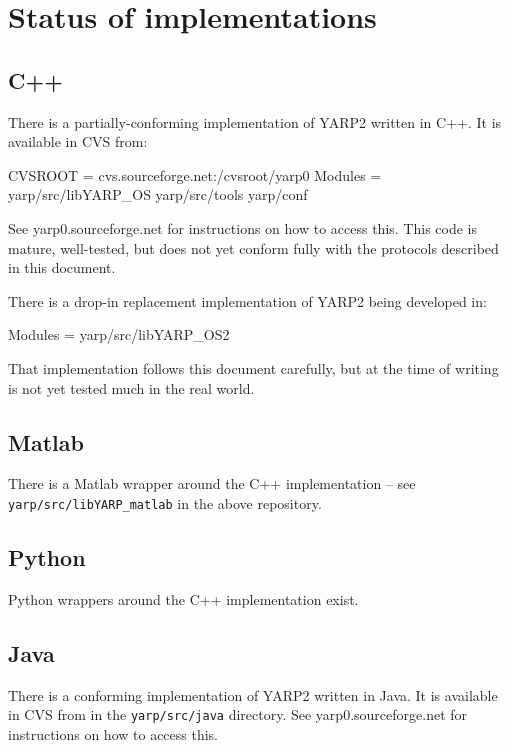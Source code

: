 

\chapter{Status of implementations}


\section{C++}

There is a partially-conforming implementation of YARP2 written
in C++.  It is available in CVS from:
\begin{code}
  CVSROOT = cvs.sourceforge.net:/cvsroot/yarp0
  Modules = yarp/src/libYARP_OS yarp/src/tools yarp/conf
\end{code}
See yarp0.sourceforge.net for instructions on how to access this.
This code is mature, well-tested, but does not yet conform fully
with the protocols described in this document.

There is a drop-in replacement implementation of YARP2 being developed
in:

\begin{code}
  Modules = yarp/src/libYARP_OS2
\end{code}

\indent
That implementation follows this document carefully, but at the
time of writing is not yet tested much in the real world.

\section{Matlab}

There is a Matlab wrapper around the C++ implementation --
see {\tt yarp/src/libYARP\_matlab} in the above repository.

\section{Python}

Python wrappers around the C++ implementation exist.


\section{Java}

There is a conforming implementation of YARP2 written in Java.
It is available in CVS from in the {\tt yarp/src/java}
directory.
See yarp0.sourceforge.net for instructions on how to access this.

